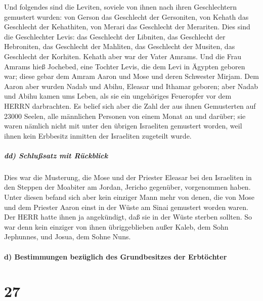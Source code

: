 Und folgendes sind die Leviten, soviele von ihnen nach
ihren Geschlechtern gemustert wurden: von Gerson das Geschlecht der
Gersoniten, von Kehath das Geschlecht der Kehathiten, von Merari das
Geschlecht der Merariten. Dies sind die Geschlechter
Levis: das Geschlecht der Libniten, das Geschlecht der Hebroniten, das
Geschlecht der Mahliten, das Geschlecht der Musiten, das Geschlecht der
Korhiten. Kehath aber war der Vater Amrams. Und die Frau
Amrams hieß Jochebed, eine Tochter Levis, die dem Levi in Ägypten
geboren war; diese gebar dem Amram Aaron und Mose und deren Schwester
Mirjam. Dem Aaron aber wurden Nadab und Abihu, Eleasar
und Ithamar geboren; aber Nadab und Abihu kamen ums
Leben, als sie ein ungehöriges Feueropfer vor dem HERRN darbrachten.
Es belief sich aber die Zahl der aus ihnen Gemusterten
auf 23000 Seelen, alle männlichen Personen von einem Monat an und
darüber; sie waren nämlich nicht mit unter den übrigen Israeliten
gemustert worden, weil ihnen kein Erbbesitz inmitten der Israeliten
zugeteilt wurde.

\hypertarget{dd-schluuxdfsatz-mit-ruxfcckblick}{%
\subparagraph{dd) Schlußsatz mit
Rückblick}\label{dd-schluuxdfsatz-mit-ruxfcckblick}}

Dies war die Musterung, die Mose und der Priester Eleasar
bei den Israeliten in den Steppen der Moabiter am Jordan, Jericho
gegenüber, vorgenommen haben. Unter diesen befand sich
aber kein einziger Mann mehr von denen, die von Mose und dem Priester
Aaron einst in der Wüste am Sinai gemustert worden waren.
Der HERR hatte ihnen ja angekündigt, daß sie in der Wüste
sterben sollten. So war denn kein einziger von ihnen übriggeblieben
außer Kaleb, dem Sohn Jephunnes, und Josua, dem Sohne Nuns.

\hypertarget{d-bestimmungen-bezuxfcglich-des-grundbesitzes-der-erbtuxf6chter}{%
\paragraph{d) Bestimmungen bezüglich des Grundbesitzes der
Erbtöchter}\label{d-bestimmungen-bezuxfcglich-des-grundbesitzes-der-erbtuxf6chter}}

\hypertarget{section-26}{%
\section{27}\label{section-26}}

